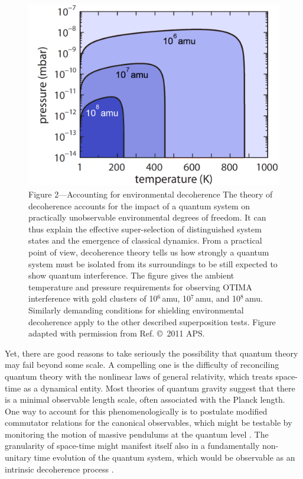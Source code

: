 \documentclass[11pt]{article}
\begin{document}
\begin{figure}
\includegraphics[width=0.8\columnwidth]{Fig2.pdf}
\\
\small
{Figure 2---Accounting for environmental decoherence}
The theory of decoherence accounts for the impact of a quantum system on practically unobservable environmental degrees of freedom\cite{Joos2003,Zurek2003}. It can thus explain the effective super-selection of distinguished system states and the emergence of classical dynamics. From a practical point of view, decoherence theory  tells us how strongly a quantum system must be isolated from its surroundings to be still  expected to show quantum interference. The figure gives the ambient temperature and pressure requirements for observing OTIMA interference with gold clusters of 10$^6$\,amu, 10$^7$\,amu, and 10$^8$\,amu. Similarly demanding conditions for shielding environmental decoherence apply to the other described superposition tests. Figure adapted with permission from Ref.  \copyright\ 2011 APS.
\end{figure} 

Yet, there are good reasons to take seriously the possibility that
quantum theory may fail beyond some scale. A compelling one is the difficulty of reconciling quantum theory with the nonlinear laws of general relativity, which treats space-time as a dynamical entity. Most theories of quantum gravity
suggest that there is a minimal observable length scale, often associated with the Planck length. One way to account for this phenomenologically is to postulate modified commutator relations for the canonical observables,
which might be testable by monitoring the motion of massive pendulums at the quantum level \cite{Abbott2009,PhysRevLett.101.221301, PhysRevD.86.085017, pikovski2012probing, marin2012gravitational}.
The granularity of space-time might  manifest itself also
in a fundamentally non-unitary time evolution of the quantum system, which would be  observable as an intrinsic decoherence process \cite{Percival1997,PhysRevLett.93.240401,Milburn-intrinsic2006,Wang2006a}.
\end{document}
